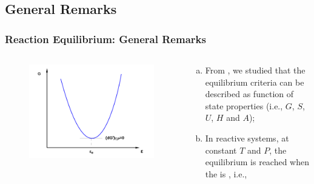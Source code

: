 \documentclass[10pt,compress,handout,unknownkeysallowed]{beamer}
\begin{document}
\subsection{General Remarks}

\begin{frame}
  \frametitle{Reaction Equilibrium: General Remarks}
  \begin{columns}
     \begin{column}[l]{0.5\linewidth}\scriptsize
      \begin{figure}%
        \begin{center}
          \includegraphics[width=1.05\columnwidth,clip]{./../Pics/ChemicalReactions_GxPlot}
        \end{center}
      \end{figure}
     \end{column}
     \begin{column}[l]{0.5\linewidth}%
        \begin{enumerate}[a)] 
           \item<1-> From , we studied that the equilibrium criteria can be described as function of state properties (i.e., $G$, $S$, $U$, $H$ and $A$);
           \item<2-> In reactive systems, at constant $T$ and $P$, the equilibrium is reached when the  is , i.e., 
        \end{enumerate}
     \end{column}
  \end{columns}
\end{frame}
\normalsize
\end{document}
